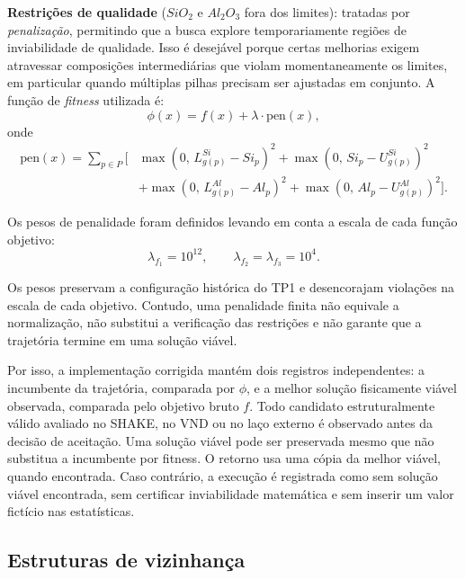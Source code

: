 \documentclass[12pt,a4paper]{article}
\begin{document}
\textbf{Restrições de qualidade} ($SiO_2$ e $Al_2O_3$ fora dos limites): tratadas por
\emph{penalização}, permitindo que a busca explore temporariamente regiões de inviabilidade
de qualidade. Isso é desejável porque certas melhorias exigem atravessar composições
intermediárias que violam momentaneamente os limites, em particular quando múltiplas pilhas
precisam ser ajustadas em conjunto. A função de \textit{fitness} utilizada é:
\begin{equation}
    \phi(x) = f(x) + \lambda \cdot \text{pen}(x),
\end{equation}
onde
\begin{equation}
\begin{aligned}
    \text{pen}(x) = \sum_{p \in P} \bigl[{}
        &\max\!\left(0,\, L_{g(p)}^{Si} - Si_p\right)^2
       + \max\!\left(0,\, Si_p - U_{g(p)}^{Si}\right)^2 \\
        &+ \max\!\left(0,\, L_{g(p)}^{Al} - Al_p\right)^2
       + \max\!\left(0,\, Al_p - U_{g(p)}^{Al}\right)^2
    \bigr].
\end{aligned}
\end{equation}

Os pesos de penalidade foram definidos levando em conta a escala de cada função objetivo:
\begin{equation}
    \lambda_{f_1} = 10^{12}, \qquad
    \lambda_{f_2} = \lambda_{f_3} = 10^{4}.
\end{equation}

Os pesos preservam a configuração histórica do TP1 e desencorajam violações
na escala de cada objetivo. Contudo, uma penalidade finita não equivale a
normalização, não substitui a verificação das restrições e não garante que a
trajetória termine em uma solução viável.

Por isso, a implementação corrigida mantém dois registros independentes:
a incumbente da trajetória, comparada por $\phi$, e a melhor solução
fisicamente viável observada, comparada pelo objetivo bruto $f$.
Todo candidato estruturalmente válido avaliado no SHAKE, no VND ou no laço
externo é observado antes da decisão de aceitação. Uma solução viável pode
ser preservada mesmo que não substitua a incumbente por fitness. O retorno
usa uma cópia da melhor viável, quando encontrada. Caso contrário, a execução
é registrada como sem solução viável encontrada, sem certificar inviabilidade
matemática e sem inserir um valor fictício nas estatísticas.

\subsection{Estruturas de vizinhança}
\end{document}
